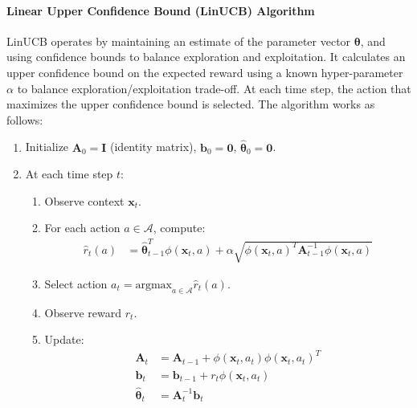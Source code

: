 \paragraph{Linear Upper Confidence Bound (LinUCB) Algorithm}
LinUCB operates by maintaining an estimate of the parameter vector $\boldsymbol{\theta}$, and using confidence bounds to balance exploration and exploitation. It calculates an upper confidence bound on the expected reward using a known hyper-parameter $\alpha$ to balance exploration/exploitation trade-off. At each time step, the action that maximizes the upper confidence bound is selected. The algorithm works as follows:
    \begin{enumerate}
        \item Initialize $\mathbf{A}_0 = \mathbf{I}$ (identity matrix), $\mathbf{b}_0 = \mathbf{0}$, $\hat{\boldsymbol{\theta}}_0 = \mathbf{0}$.
        \item At each time step $t$:
          \begin{enumerate}
              \item Observe context $\mathbf{x}_t$.
              \item For each action $a \in \mathcal{A}$, compute:
              \begin{align*}
                \hat{r}_t(a) &= \hat{\boldsymbol{\theta}}_{t-1}^T \phi(\mathbf{x}_t, a) + \alpha \sqrt{ \phi(\mathbf{x}_t, a)^T \mathbf{A}_{t-1}^{-1} \phi(\mathbf{x}_t, a)}
              \end{align*}
              \item Select action $a_t = \text{argmax}_{a \in \mathcal{A}} \hat{r}_t(a)$.
              \item Observe reward $r_t$.
              \item Update:
              \begin{align*}
                  \mathbf{A}_t &= \mathbf{A}_{t-1} + \phi(\mathbf{x}_t, a_t) \phi(\mathbf{x}_t, a_t)^T \\
                  \mathbf{b}_t &= \mathbf{b}_{t-1} + r_t \phi(\mathbf{x}_t, a_t) \\
                  \hat{\boldsymbol{\theta}}_t &= \mathbf{A}_t^{-1} \mathbf{b}_t
              \end{align*}
          \end{enumerate}
    \end{enumerate}
